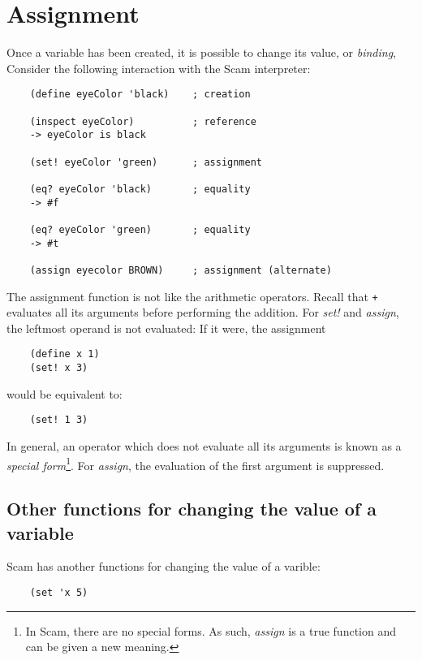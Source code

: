 \chapter{Assignment}
\label{Assignment}

Once a variable has been created, it is possible to change its value,
or {\it binding},
Consider the following interaction with
the Scam interpreter:

\begin{verbatim}
    (define eyeColor 'black)    ; creation
    
    (inspect eyeColor)          ; reference
    -> eyeColor is black
    
    (set! eyeColor 'green)      ; assignment
    
    (eq? eyeColor 'black)       ; equality
    -> #f
    
    (eq? eyeColor 'green)       ; equality
    -> #t

    (assign eyecolor BROWN)     ; assignment (alternate)
\end{verbatim}

The assignment function is not like the arithmetic operators.
Recall that {\tt +} evaluates all its arguments
before performing the addition.
For {\it set!} and {\it assign},
the leftmost operand is not evaluated:
If it were, the assignment

\begin{verbatim}
    (define x 1)
    (set! x 3)
\end{verbatim}
    
would be equivalent to:

\begin{verbatim}
    (set! 1 3)
\end{verbatim}

In general, an operator which does not evaluate
all its arguments is known as a {\it special form}\footnote{
In Scam, there are no special forms. As such, {\it assign} is
a true function and can be given a new meaning.}.
For {\it assign}, the evaluation of the first argument
is suppressed.

\section{Other functions for changing the value of a variable}

Scam has another functions for changing the value of a
varible:

\begin{verbatim}
    (set 'x 5)
\end{verbatim}

